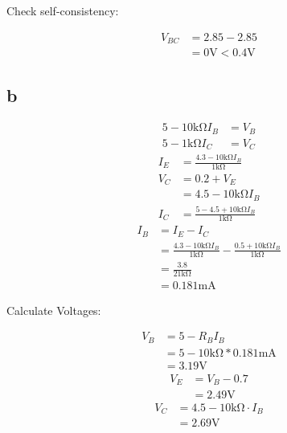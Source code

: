 \documentclass{article}
\begin{document}
\begin{multicols}{2}
    Check self-consistency:

    \begin{align*}
        V_{BC} & = 2.85- 2.85                    \\
               & = 0 \si{\volt} < 0.4 \si{\volt}
    \end{align*}

    \subsection*{b}
    \begin{align*}
        5- 10\si{\kilo\ohm}  I_B & = V_B \\
        5- 1\si{\kilo\ohm} I_C   & = V_C
    \end{align*}
    \begin{align*}
        I_E & = \frac{4.3 - 10\si{\kilo\ohm}I_B }{1\si{\kilo\ohm}}      \\
        V_C & = 0.2 + V_E                                               \\
            & = 4.5 - 10\si{\kilo\ohm} I_B                              \\
        I_C & = \frac{5 - 4.5 + 10\si{\kilo\ohm} I_B }{1\si{\kilo\ohm}}
    \end{align*}
    \begin{align*}
        I_B & = I_E - I_C                                                                                                \\
            & = \frac{4.3 - 10\si{\kilo\ohm}I_B }{1\si{\kilo\ohm}} - \frac{0.5 + 10\si{\kilo\ohm} I_B }{1\si{\kilo\ohm}} \\
            & = \frac{3.8}{21\si{\kilo\ohm}}                                                                             \\
            & = 0.181\si{\milli\ampere}
    \end{align*}

    Calculate Voltages:

    \begin{align*}
        V_B & = 5 - R_B I_B                                     \\
            & = 5 - 10 \si{\kilo\ohm} * 0.181\si{\milli\ampere} \\
            & = \boxed{3.19 \si{\volt}}
    \end{align*}
    \begin{align*}
        V_E & = V_B - 0.7              \\
            & = \boxed{2.49\si{\volt}}
    \end{align*}
    \begin{align*}
        V_C & = 4.5 - 10\si{\kilo\ohm} \cdot I_B \\
            & = \boxed{2.69 \si{\volt}}
    \end{align*}


\end{multicols}
\end{document}
